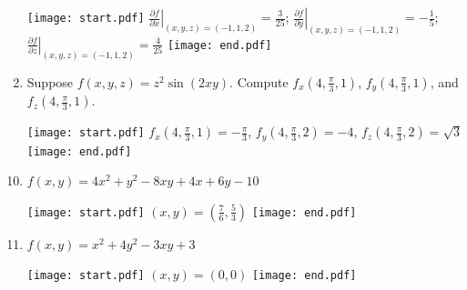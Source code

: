 \documentclass[12pt]{article}
\begin{document}
\begin{enumerate}
\texttt{[image: start.pdf]}
{{$\left.\frac{\partial f}{\partial x}\right|_{(x,y,z)=(-1,1,2)}=\frac{3}{25}$; $\left.\frac{\partial f}{\partial y}\right|_{(x,y,z)=(-1,1,2)}=-\frac{1}{5}$; $\left.\frac{\partial f}{\partial z}\right|_{(x,y,z)=(-1,1,2)}=\frac{4}{25}$}}
\texttt{[image: end.pdf]}


\item Suppose $f(x,y,z)=z^2\sin{(2xy)}$.  Compute $f_x\left(4, \frac{\pi}{3}, 1\right)$, $f_y\left(4, \frac{\pi}{3}, 1\right)$, and $f_z\left(4, \frac{\pi}{3}, 1\right)$.

\texttt{[image: start.pdf]}
{{$f_x\left(4,\frac{\pi}{3},1\right)=-\frac{\pi}{3}$, $f_y\left(4,\frac{\pi}{3},2\right)=-4$, $f_z\left(4,\frac{\pi}{3},2\right)=\sqrt{3}$} }
\texttt{[image: end.pdf]}


\end{enumerate}


\begin{enumerate}
\setcounter{enumi}{9}

\item $f(x,y)=4x^2+y^2-8xy+4x+6y-10$ 

\texttt{[image: start.pdf]}
{{$(x,y)=\left(\frac{7}{6},\frac{5}{3}\right)$}}
\texttt{[image: end.pdf]}


\item $f(x,y)=x^2+4y^2-3xy+3$ 

\texttt{[image: start.pdf]}
{{$(x,y)=(0,0)$}}
\texttt{[image: end.pdf]}


\end{enumerate}

\end{document}
